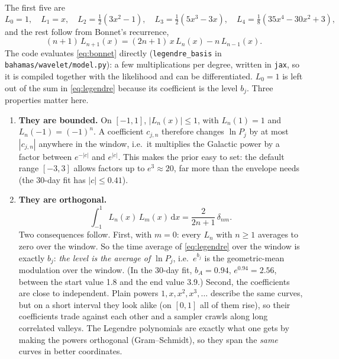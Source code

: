 \documentclass[11pt,a4paper]{article}
\newcommand{\dd}{\mathrm{d}}
\begin{document}
The first five are
\begin{equation}
  L_0=1,\quad L_1=x,\quad L_2=\tfrac12(3x^2-1),\quad L_3=\tfrac12(5x^3-3x),\quad
  L_4=\tfrac18(35x^4-30x^2+3),
\end{equation}
and the rest follow from Bonnet's recurrence,
\begin{equation}
  (n+1)\,L_{n+1}(x) = (2n+1)\,x\,L_n(x) - n\,L_{n-1}(x).
  \label{eq:bonnet}
\end{equation}
The code evaluates \cref{eq:bonnet} directly (\texttt{legendre\_basis} in
\texttt{bahamas/wavelet/model.py}): a few multiplications per degree, written in
\texttt{jax}, so it is compiled together with the likelihood and can be
differentiated. $L_0=1$ is left out of the sum in \cref{eq:legendre} because its
coefficient is the level $b_j$. Three properties matter here.
\begin{enumerate}
  \item \textbf{They are bounded.} On $[-1,1]$, $|L_n(x)|\le1$, with $L_n(1)=1$ and
        $L_n(-1)=(-1)^n$. A coefficient $c_{j,n}$ therefore changes $\ln P_j$ by at most
        $|c_{j,n}|$ anywhere in the window, i.e.\ it multiplies the Galactic power by a
        factor between $e^{-|c|}$ and $e^{|c|}$. This makes the prior easy to set: the
        default range $[-3,3]$ allows factors up to $e^3\approx20$, far more than the
        envelope needs (the 30-day fit has $|c|\le0.41$).
  \item \textbf{They are orthogonal.}
        \begin{equation}
          \int_{-1}^{1} L_n(x)\,L_m(x)\,\dd x = \frac{2}{2n+1}\,\delta_{nm}.
          \label{eq:legortho}
        \end{equation}
        Two consequences follow. First, with $m=0$: every $L_n$ with $n\ge1$ averages
        to zero over the window. So the time average of \cref{eq:legendre} over the
        window is exactly $b_j$: \emph{the level is the average of $\ln P_j$}, i.e.\
        $e^{b_j}$ is the geometric-mean modulation over the window. (In the 30-day fit,
        $b_A=0.94$, $e^{0.94}=2.56$, between the start value 1.8 and the end value 3.9.)
        Second, the coefficients are close to independent. Plain powers
        $1,x,x^2,x^3,\dots$ describe the same curves, but on a short interval they look
        alike (on $[0,1]$ all of them rise), so their coefficients trade against each
        other and a sampler crawls along long correlated valleys. The Legendre
        polynomials are exactly what one gets by making the powers orthogonal
        (Gram--Schmidt), so they span the \emph{same} curves in better coordinates.

\end{enumerate}
\end{document}
